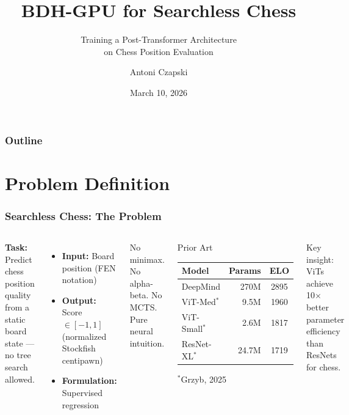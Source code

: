 \documentclass{beamer}
\title[BDH Searchless Chess]{BDH-GPU for Searchless Chess}
\subtitle{Training a Post-Transformer Architecture\\on Chess Position Evaluation}
\author{Antoni Czapski}
\institute[]{
  Project: Deep Learning\\
  Proposal Presentation
}
\date{March 10, 2026}
\begin{document}
\frame{\titlepage}

\begin{frame}
\frametitle{Outline}
\tableofcontents
\end{frame}

\section{Problem Definition}

\begin{frame}
\frametitle{Searchless Chess: The Problem}

\begin{columns}
\textbf{Task:} Predict chess position quality from a static board state --- no tree search allowed.

\vspace{0.5em}
\begin{itemize}
    \item \textbf{Input:} Board position (FEN notation)
    \item \textbf{Output:} Score $\in [-1, 1]$\\(normalized Stockfish centipawn)
    \item \textbf{Formulation:} Supervised regression
\end{itemize}

\vspace{0.5em}
No minimax. No alpha-beta. No MCTS.\\
\alert{Pure neural intuition.}

\begin{block}{Prior Art}
\footnotesize
\begin{tabular}{lrc}
\toprule
\textbf{Model} & \textbf{Params} & \textbf{ELO} \\
\midrule
DeepMind & 270M & 2895 \\
ViT-Med$^*$ & 9.5M & 1960 \\
ViT-Small$^*$ & 2.6M & 1817 \\
ResNet-XL$^*$ & 24.7M & 1719 \\
\bottomrule
\end{tabular}

\vspace{0.3em}
$^*$Grzyb, 2025
\end{block}

\vspace{0.3em}
\footnotesize Key insight: ViTs achieve \alert{10$\times$ better} parameter efficiency than ResNets for chess.
\end{columns}

\end{frame}
\end{document}
